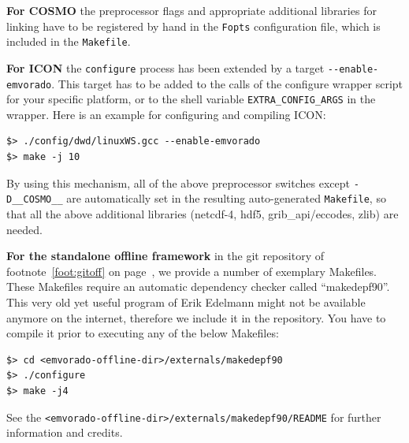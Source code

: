 \documentclass[10pt,a4paper,twoside,headinclude,footinclude,parskip=half]{scrartcl}
\newcommand{\srcform}[1]{\mbox{\texttt{#1}}\xspace}%
\begin{document}
\textbf{For COSMO} the preprocessor flags and appropriate additional libraries for linking have to be registered
by hand in the \srcform{Fopts} configuration file, which is included in the \srcform{Makefile}.

\textbf{For ICON} the \srcform{configure} process has been extended by a target \verb|--enable-emvorado|.
This target has to be added to the calls of the configure wrapper script for your specific platform,
or to the shell variable \srcform{EXTRA_CONFIG_ARGS} in the wrapper.
Here is an example for configuring and compiling ICON:
\begin{verbatim}
$> ./config/dwd/linuxWS.gcc --enable-emvorado
$> make -j 10
\end{verbatim}
By using this mechanism, all of the above preprocessor switches except \srcform{-D__COSMO__} are automatically set in the resulting
auto-generated \srcform{Makefile}, so that all the above additional libraries (netcdf-4, hdf5, grib_api/eccodes, zlib) are needed.

\textbf{For the standalone offline framework} in the git repository of footnote~\ref{foot:gitoff} on page~\pageref{foot:gitoff}, we provide a number of exemplary Makefiles.
These Makefiles require an automatic dependency checker called ``makedepf90''. This very old yet useful program of Erik Edelmann might not be available
anymore on the internet, therefore we include it in the repository. You have to compile it prior to executing any of the below Makefiles:
\begin{verbatim}
$> cd <emvorado-offline-dir>/externals/makedepf90
$> ./configure
$> make -j4
\end{verbatim}
See the \verb|<emvorado-offline-dir>/externals/makedepf90/README| for further information and credits.
\end{document}
